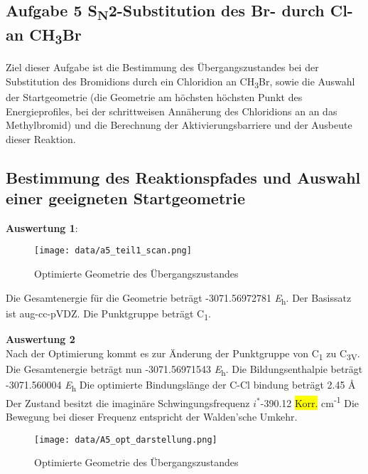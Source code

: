 \documentclass[12pt]{article}
\begin{document}
\begin{onehalfspace}
\newpage

\section{Aufgabe 5 S\textsubscript{N}2-Substitution des Br- durch Cl- an CH\textsubscript{3}Br}

Ziel dieser Aufgabe ist die Bestimmung des Übergangszustandes bei der
Substitution des Bromidions durch ein Chloridion an CH\textsubscript{3}Br,
sowie die Auswahl der Startgeometrie (die Geometrie am höchsten höchsten Punkt
des Energieprofiles, bei der schrittweisen Annäherung des Chloridions an an
das Methylbromid) und die Berechnung der Aktivierungsbarriere und der Ausbeute
dieser Reaktion.

\subsection{Bestimmung des Reaktionspfades und Auswahl einer geeigneten Startgeometrie}



\textbf{Auswertung 1}:

\begin{figure}[!htbp]
\centering
  \texttt{[image: data/a5\_teil1\_scan.png]}%
  \caption{Optimierte Geometrie des Übergangszustandes}
\end{figure}
\noindent

 Die Gesamtenergie für die Geometrie beträgt -3071.56972781 \si{\hartree}.
 Der Basissatz ist aug-cc-pVDZ. Die Punktgruppe beträgt C\textsubscript{1}.

\textbf{Auswertung 2 }\\

Nach der Optimierung kommt es zur Änderung der Punktgruppe von
C\textsubscript{1} zu C\textsubscript{3V}. Die Gesamtenergie beträgt nun
-3071.56971543 \si{\hartree}. Die Bildungsenthalpie beträgt -3071.560004
\si{\hartree} Die optimierte Bindungslänge der C-Cl bindung beträgt 2.45
\si{\angstrom}
Der Zustand besitzt die imaginäre Schwingungsfrequenz $i^*$-390.12 \colorbox{yellow}{Korr.}
cm\textsuperscript{-1} Die Bewegung bei dieser Frequenz entspricht der
Walden'sche Umkehr.

\begin{figure}[!htbp]
\centering
  \texttt{[image: data/A5\_opt\_darstellung.png]}%
  \caption{Optimierte Geometrie des Übergangszustandes}
\end{figure}
\noindent

\newpage


\end{onehalfspace}
\end{document}
